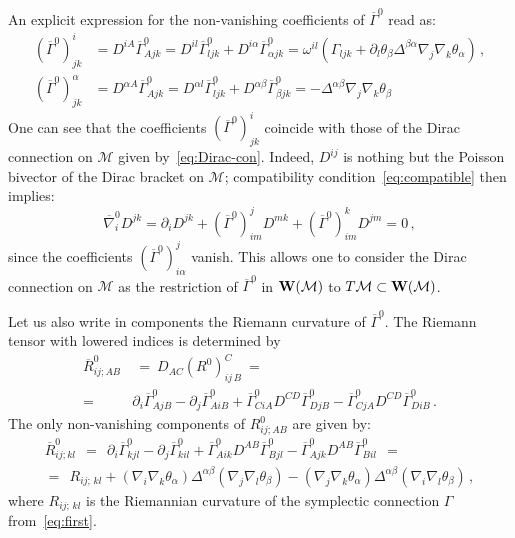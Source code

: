 \documentclass[a4paper,11pt]{amsart}
\numberwithin{thm}{section} %
\numberwithin{equation}{section} %
\numberwithin{figure}{section} %
\renewcommand{\:}{{\rm\, :\,}}
\def\bar{\overline}
\def\d{\partial}
\def\manM{{\mathcal M}}
\def\W{{\bf W}}
\def\con{{\bar\Gamma}}
\def\Dcon-d{{\bar\nabla}^0}
\begin{document}
An explicit expression for the non-vanishing coefficients
of $\con^0$ read as:
\begin{equation}
\label{eq:con0-explicit}
\begin{split}
(\con^0)^i_{jk}&=
D^{iA}{\con^0_{Ajk}}=
D^{il}{\con^0_{ljk}}+D^{i\alpha} {\con^0_{\alpha jk}}=
\omega^{il}(\Gamma_{ljk}+\d_l\theta_\beta \Delta^{\beta \alpha}
\nabla_j \nabla_k \theta_\alpha)\,,\\
(\con^0)^\alpha_{jk}&=D^{\alpha A} \con^0_{A jk}=
D^{\alpha l} \con^0_{ljk}
+D^{\alpha \beta} \con^0_{\beta jk}=
-\Delta^{\alpha \beta}\nabla_j\nabla_k \theta_\beta
\end{split}
\end{equation}
One can see that the coefficients $(\con^0)^i_{jk}$ coincide with those of
the Dirac connection on $\manM$ given by~\eqref{eq:Dirac-con}. Indeed,
$D^{ij}$ is nothing but the Poisson bivector of the Dirac bracket on
$\manM$; compatibility condition~\eqref{eq:compatible} then implies:
\begin{equation}
\Dcon-d_i D^{jk}=\d_i D^{jk}+(\con^0)^j_{im}D^{mk}+(\con^0)^k_{im}D^{jm}=0\,,
\end{equation}
since the coefficients $(\con^0)^j_{i\alpha}$ vanish. This allows one
to consider the Dirac connection on $\manM$ as the restriction
of $\con^0$ in $\W(\manM)$ to $T\manM\subset \W(\manM)$.

Let us also write in components the Riemann curvature
of $\con^0$. The Riemann tensor with lowered indices is determined by
\begin{equation}
  \begin{split}
    {\bar R}^0_{ij;AB}&~=~D_{AC}(R^0)^C_{ij\,B}~=\\
=~&\d_i \con^0_{AjB}-\d_j \con^0_{AiB}+\con^0_{CiA}D^{CD}\con^0_{DjB}
-\con^0_{CjA}D^{CD}\con^0_{DiB}\,.
  \end{split}
\end{equation}
The only non-vanishing components of $R^0_{ij;AB}$ are
given by:
\begin{multline}
    {\bar R}^0_{ij;kl}~~=~~\d_i \con^0_{kjl}-
\d_j \con^0_{kil}+
\con^0_{Aik}D^{AB}\con^0_{Bjl}-
\con^0_{Ajk}D^{AB}\con^0_{Bil}~~=\\
=~~R_{ij;\,kl}+
(\nabla_{i}\nabla_{k}\theta_\alpha)
\Delta^{\alpha\beta}
(\nabla_{j}\nabla_{l}\theta_\beta)-
(\nabla_{j}\nabla_{k}\theta_\alpha)
\Delta^{\alpha\beta}
(\nabla_{i}\nabla_{l}\theta_\beta)\,,
\end{multline}
where $R_{ij;\,kl}$ is the Riemannian curvature of the symplectic
connection $\Gamma$ from~\eqref{eq:first}. 
\end{document}
